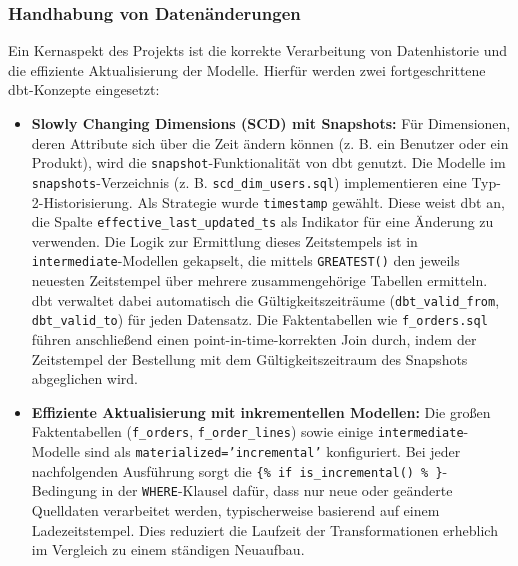 \documentclass[
    12pt,               
    a4paper,        
    ngerman            
]{scrartcl}
\begin{document}
\subsubsection{Handhabung von Datenänderungen}
\label{sssec:dbt_datenhandling}
Ein Kernaspekt des Projekts ist die korrekte Verarbeitung von Datenhistorie und die effiziente Aktualisierung der Modelle. Hierfür werden zwei fortgeschrittene dbt-Konzepte eingesetzt:
\begin{itemize}
    \item \textbf{Slowly Changing Dimensions (SCD) mit Snapshots:} Für Dimensionen, deren Attribute sich über die Zeit ändern können (z. B. ein Benutzer oder ein Produkt), wird die \texttt{snapshot}-Funktionalität von dbt genutzt. Die Modelle im \texttt{snapshots}-Verzeichnis (z. B. \texttt{scd\_dim\_users.sql}) implementieren eine Typ-2-Historisierung. Als Strategie wurde \texttt{timestamp} gewählt. Diese weist dbt an, die Spalte \texttt{effective\_last\_updated\_ts} als Indikator für eine Änderung zu verwenden. Die Logik zur Ermittlung dieses Zeitstempels ist in \texttt{intermediate}-Modellen gekapselt, die mittels \texttt{GREATEST()} den jeweils neuesten Zeitstempel über mehrere zusammengehörige Tabellen ermitteln. dbt verwaltet dabei automatisch die Gültigkeitszeiträume (\texttt{dbt\_valid\_from}, \texttt{dbt\_valid\_to}) für jeden Datensatz. Die Faktentabellen wie \texttt{f\_orders.sql} führen anschließend einen point-in-time-korrekten Join durch, indem der Zeitstempel der Bestellung mit dem Gültigkeitszeitraum des Snapshots abgeglichen wird.

    \item \textbf{Effiziente Aktualisierung mit inkrementellen Modellen:} Die großen Faktentabellen (\texttt{f\_orders}, \texttt{f\_order\_lines}) sowie einige \texttt{intermediate}-Modelle sind als \texttt{materialized='incremental'} konfiguriert. Bei jeder nachfolgenden Ausführung sorgt die \texttt{\{\% if is\_incremental() \% \}}-Bedingung in der \texttt{WHERE}-Klausel dafür, dass nur neue oder geänderte Quelldaten verarbeitet werden, typischerweise basierend auf einem Ladezeitstempel. Dies reduziert die Laufzeit der Transformationen erheblich im Vergleich zu einem ständigen Neuaufbau.
\end{itemize}
\end{document}
